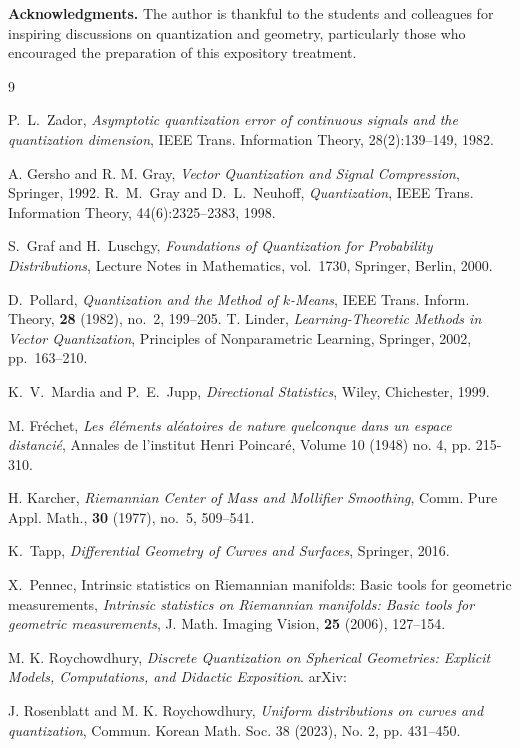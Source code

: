 \documentclass[12pt, reqno]{amsart}
\theoremstyle{plain}
\theoremstyle{definition}
\begin{document}
\bigskip

\noindent\textbf{Acknowledgments.}
The author is thankful to the students and colleagues for inspiring discussions on quantization and geometry, particularly those who encouraged the preparation of this expository treatment.

 
\begin{thebibliography}{9}

 P.~L.~Zador, \emph{Asymptotic quantization error of continuous signals and the quantization dimension}, IEEE Trans. Information Theory, 28(2):139--149, 1982.

 A. Gersho and R. M. Gray, \emph{Vector Quantization and Signal Compression}, Springer, 1992.
 R.~M.~Gray and D.~L.~Neuhoff, \emph{Quantization}, IEEE Trans.  Information Theory, 44(6):2325--2383, 1998.

  S.~Graf and H.~Luschgy, \emph{Foundations of Quantization for Probability Distributions}, Lecture Notes in Mathematics, vol.~1730, Springer, Berlin, 2000.


 D.~Pollard, \emph{Quantization and the Method of $k$-Means}, IEEE Trans. Inform. Theory, \textbf{28} (1982), no.~2, 199--205.
 T. Linder, \emph{Learning-Theoretic Methods in Vector Quantization},  Principles of Nonparametric Learning,  Springer, 2002, pp.~163--210.

 K.~V.~Mardia and P.~E.~Jupp, \emph{Directional Statistics}, Wiley, Chichester, 1999. 

 M. Fréchet, \emph{Les éléments aléatoires de nature quelconque dans un espace distancié}, Annales de l'institut Henri Poincaré, Volume 10 (1948) no. 4, pp. 215-310.

H. Karcher, \emph{Riemannian Center of Mass and Mollifier Smoothing}, Comm. Pure Appl. Math., \textbf{30} (1977), no.~5, 509--541.

 K.~Tapp, \emph{Differential Geometry of Curves and Surfaces}, Springer, 2016.

 X.~Pennec,
Intrinsic statistics on Riemannian manifolds: Basic tools for geometric measurements, \emph{Intrinsic statistics on Riemannian manifolds: Basic tools for geometric measurements}, J. Math. Imaging Vision,  \textbf{25} (2006), 127--154.
 
 M. K. Roychowdhury, \emph{Discrete Quantization on Spherical Geometries: Explicit Models, Computations, and Didactic Exposition}. arXiv: 

 J. Rosenblatt and M. K. Roychowdhury, \emph{Uniform distributions on curves and quantization}, Commun. Korean Math. Soc. 38 (2023), No. 2, pp. 431–450.



 
\end{thebibliography}
\end{document}
